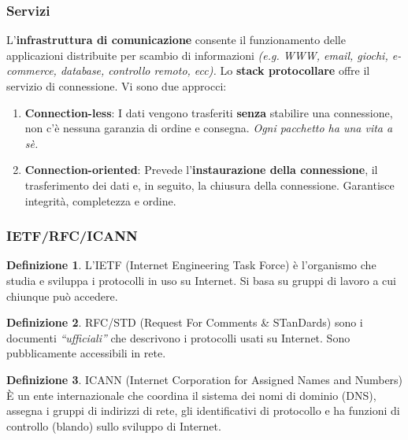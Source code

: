 \documentclass[11pt,a4paper,oneside]{book}
\theoremstyle{definition}
\newtheorem{definition}{Definizione}[section]
\begin{document}
\pagebreak

\subsubsection{Servizi}
L’\textbf{infrastruttura di comunicazione} consente il funzionamento delle applicazioni distribuite per scambio di informazioni \textit{(e.g. WWW, email, giochi, e-commerce, database, controllo remoto, ecc).}\newline
Lo \textbf{stack protocollare} offre il servizio di connessione. Vi sono due approcci:
\begin{enumerate}
	\item \textbf{Connection-less}: I dati vengono trasferiti \textbf{senza} stabilire una
	      connessione, non c'è nessuna garanzia di ordine e consegna. \textit{Ogni pacchetto ha una vita a sè.}
	\item \textbf{Connection-oriented}: Prevede l'\textbf{instaurazione della connessione}, il trasferimento dei dati e, in seguito, la chiusura della connessione. Garantisce integrità, completezza e ordine.
\end{enumerate}

\subsubsection{IETF/RFC/ICANN}

\theoremstyle{definition}
\begin{definition}
	L'IETF (Internet Engineering Task Force) è l’organismo che studia e sviluppa i protocolli in uso su Internet. Si basa su gruppi di lavoro a cui chiunque può accedere.
\end{definition}

\theoremstyle{definition}
\begin{definition}
	RFC/STD (Request For Comments \& STanDards) sono i documenti \textit{“ufficiali” } che descrivono i protocolli usati su Internet. Sono pubblicamente accessibili in rete.
\end{definition}

\theoremstyle{definition}
\begin{definition}
	ICANN (Internet Corporation for Assigned Names and Numbers) È un ente internazionale che coordina il sistema dei nomi di dominio (DNS), assegna i gruppi di indirizzi di rete, gli identificativi di protocollo e ha funzioni di controllo (blando) sullo sviluppo di Internet.
\end{definition}
\end{document}
